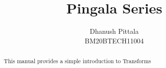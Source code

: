 \documentclass[journal,12pt,twocolumn]{IEEEtran}
\begin{document}
	\renewcommand{\thefigure}{\arabic{section}.\arabic{figure}}
	\makeatletter
	\makeatother
	
	
	\def\putbox#1#2#3{\makebox[0in][l]{\makebox[#1][l]{}\raisebox{\baselineskip}[0in][0in]{\raisebox{#2}[0in][0in]{#3}}}}
	\def\rightbox#1{\makebox[0in][r]{#1}}
	\def\centbox#1{\makebox[0in]{#1}}
	\def\topbox#1{\raisebox{-\baselineskip}[0in][0in]{#1}}
	\def\midbox#1{\raisebox{-0.5\baselineskip}[0in][0in]{#1}}
	
	\vspace{3cm}
	
	\title{ 
		Pingala Series
	}
	
	
	
	\author{Dhanush Pittala\\BM20BTECH11004}
	
	\maketitle
	
	
	\tableofcontents
	
	\bigskip
	
	\begin{abstract}
		This manual provides a simple introduction to Transforms
	\end{abstract}
\end{document}
